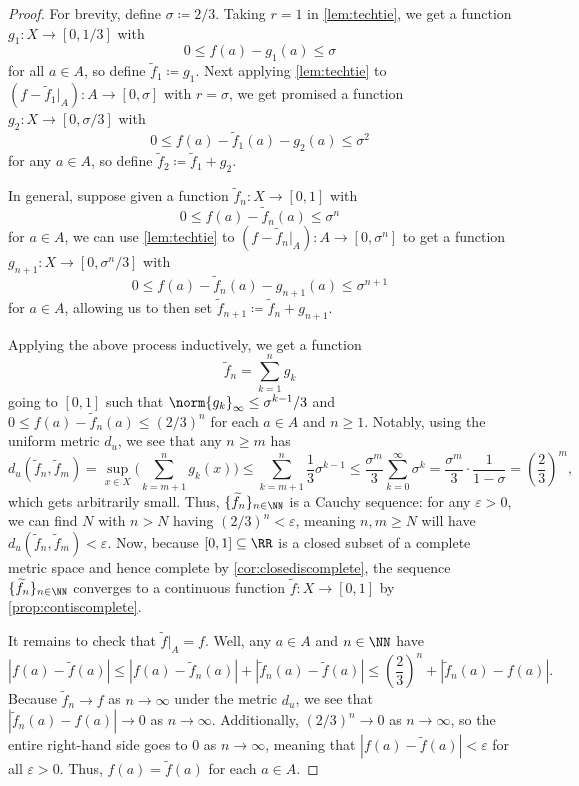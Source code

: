 \documentclass[../notes.tex]{subfiles}
\begin{document}
\begin{proof}
	For brevity, define $\sigma\coloneqq2/3$. Taking $r=1$ in \autoref{lem:techtie}, we get a function $g_1\colon X\to[0,1/3]$ with
	\[0\le f(a)-g_1(a)\le\sigma\]
	for all $a\in A$, so define $\widetilde f_1\coloneqq g_1$. Next applying \autoref{lem:techtie} to $(f-\widetilde f_1|_A)\colon A\to[0,\sigma]$ with $r=\sigma$, we get promised a function $g_2\colon X\to[0,\sigma/3]$ with
	\[0\le f(a)-\widetilde f_1(a)-g_2(a)\le\sigma^2\]
	for any $a\in A$, so define $\widetilde f_2\coloneqq\widetilde f_1+g_2$.
	
	In general, suppose given a function $\widetilde f_n\colon X\to[0,1]$ with
	\[0\le f(a)-\widetilde f_n(a)\le\sigma^n\]
	for $a\in A$, we can use \autoref{lem:techtie} to $(f-\widetilde f_n|_A)\colon A\to[0,\sigma^n]$ to get a function $g_{n+1}\colon X\to[0,\sigma^n/3]$ with
	\[0\le f(a)-\widetilde f_n(a)-g_{n+1}(a)\le\sigma^{n+1}\]
	for $a\in A$, allowing us to then set $\widetilde f_{n+1}\coloneqq\widetilde f_n+g_{n+1}$.

	Applying the above process inductively, we get a function
	\[\widetilde f_n=\sum_{k=1}^ng_k\]
	going to $[0,1]$ such that $\norm{g_k}_\infty\le\sigma^{k-1}/3$ and $0\le f(a)-\widetilde f_n(a)\le(2/3)^n$ for each $a\in A$ and $n\ge1$. Notably, using the uniform metric $d_u$, we see that any $n\ge m$ has
	\[d_u(\widetilde f_n,\widetilde f_m)=\sup_{x\in X}\Bigg(\sum_{k=m+1}^ng_k(x)\Bigg)\le\sum_{k=m+1}^n\frac13\sigma^{k-1}
	\le\frac{\sigma^m}3\sum_{k=0}^\infty\sigma^k=\frac{\sigma^m}3\cdot\frac1{1-\sigma}=\left(\frac23\right)^m,
	\]
	which gets arbitrarily small. Thus, $\{\widetilde f_n\}_{n\in\NN}$ is a Cauchy sequence: for any $\varepsilon>0$, we can find $N$ with $n>N$ having $(2/3)^n<\varepsilon$, meaning $n,m\ge N$ will have $d_u(\widetilde f_n,\widetilde f_m)<\varepsilon$. Now, because $[0,1]\subseteq\RR$ is a closed subset of a complete metric space and hence complete by \autoref{cor:closediscomplete}, the sequence $\{\widetilde f_n\}_{n\in\NN}$ converges to a continuous function $\widetilde f\colon X\to[0,1]$ by \autoref{prop:contiscomplete}.

	It remains to check that $\widetilde f|_A=f$. Well, any $a\in A$ and $n\in\NN$ have
	\[|f(a)-\widetilde f(a)|\le|f(a)-\widetilde f_n(a)|+|\widetilde f_n(a)-\widetilde f(a)|\le\left(\frac23\right)^n+|\widetilde f_n(a)-f(a)|.\]
	Because $\widetilde f_n\to f$ as $n\to\infty$ under the metric $d_u$, we see that $|\widetilde f_n(a)-f(a)|\to0$ as $n\to\infty$. Additionally, $(2/3)^n\to0$ as $n\to\infty$, so the entire right-hand side goes to $0$ as $n\to\infty$, meaning that $|f(a)-\widetilde f(a)|<\varepsilon$ for all $\varepsilon>0$. Thus, $f(a)=\widetilde f(a)$ for each $a\in A$.
\end{proof}
\end{document}
